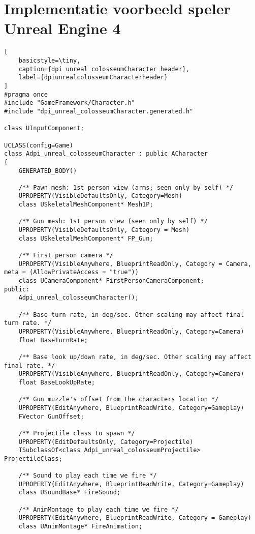 \lstset {language=C++}
\lhead{}
\chapter{Implementatie voorbeeld speler Unreal Engine 4}
\label{appendix:dpi_unreal_colosseumCharacter}

\begin{lstlisting}[
	basicstyle=\tiny, 
	caption={dpi unreal colosseumCharacter header}, 
	label={dpiunrealcolosseumCharacterheader}
]
#pragma once
#include "GameFramework/Character.h"
#include "dpi_unreal_colosseumCharacter.generated.h"

class UInputComponent;

UCLASS(config=Game)
class Adpi_unreal_colosseumCharacter : public ACharacter
{
	GENERATED_BODY()

	/** Pawn mesh: 1st person view (arms; seen only by self) */
	UPROPERTY(VisibleDefaultsOnly, Category=Mesh)
	class USkeletalMeshComponent* Mesh1P;

	/** Gun mesh: 1st person view (seen only by self) */
	UPROPERTY(VisibleDefaultsOnly, Category = Mesh)
	class USkeletalMeshComponent* FP_Gun;

	/** First person camera */
	UPROPERTY(VisibleAnywhere, BlueprintReadOnly, Category = Camera, meta = (AllowPrivateAccess = "true"))
	class UCameraComponent* FirstPersonCameraComponent;
public:
	Adpi_unreal_colosseumCharacter();

	/** Base turn rate, in deg/sec. Other scaling may affect final turn rate. */
	UPROPERTY(VisibleAnywhere, BlueprintReadOnly, Category=Camera)
	float BaseTurnRate;

	/** Base look up/down rate, in deg/sec. Other scaling may affect final rate. */
	UPROPERTY(VisibleAnywhere, BlueprintReadOnly, Category=Camera)
	float BaseLookUpRate;

	/** Gun muzzle's offset from the characters location */
	UPROPERTY(EditAnywhere, BlueprintReadWrite, Category=Gameplay)
	FVector GunOffset;

	/** Projectile class to spawn */
	UPROPERTY(EditDefaultsOnly, Category=Projectile)
	TSubclassOf<class Adpi_unreal_colosseumProjectile> ProjectileClass;

	/** Sound to play each time we fire */
	UPROPERTY(EditAnywhere, BlueprintReadWrite, Category=Gameplay)
	class USoundBase* FireSound;

	/** AnimMontage to play each time we fire */
	UPROPERTY(EditAnywhere, BlueprintReadWrite, Category = Gameplay)
	class UAnimMontage* FireAnimation;


\end{lstlisting}
